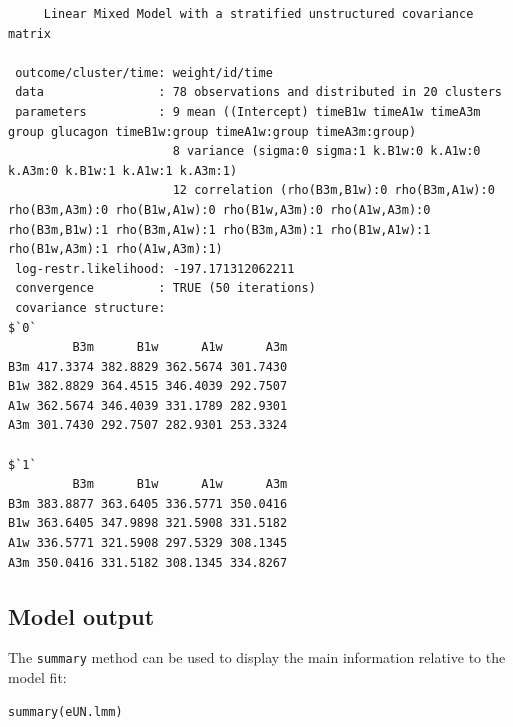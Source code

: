 \documentclass[12pt]{article}
\begin{document}
\begin{verbatim}
     Linear Mixed Model with a stratified unstructured covariance matrix 

 outcome/cluster/time: weight/id/time 
 data                : 78 observations and distributed in 20 clusters 
 parameters          : 9 mean ((Intercept) timeB1w timeA1w timeA3m group glucagon timeB1w:group timeA1w:group timeA3m:group) 
                       8 variance (sigma:0 sigma:1 k.B1w:0 k.A1w:0 k.A3m:0 k.B1w:1 k.A1w:1 k.A3m:1) 
                       12 correlation (rho(B3m,B1w):0 rho(B3m,A1w):0 rho(B3m,A3m):0 rho(B1w,A1w):0 rho(B1w,A3m):0 rho(A1w,A3m):0 rho(B3m,B1w):1 rho(B3m,A1w):1 rho(B3m,A3m):1 rho(B1w,A1w):1 rho(B1w,A3m):1 rho(A1w,A3m):1) 
 log-restr.likelihood: -197.171312062211 
 convergence         : TRUE (50 iterations)
 covariance structure: 
$`0`
         B3m      B1w      A1w      A3m
B3m 417.3374 382.8829 362.5674 301.7430
B1w 382.8829 364.4515 346.4039 292.7507
A1w 362.5674 346.4039 331.1789 282.9301
A3m 301.7430 292.7507 282.9301 253.3324

$`1`
         B3m      B1w      A1w      A3m
B3m 383.8877 363.6405 336.5771 350.0416
B1w 363.6405 347.9898 321.5908 331.5182
A1w 336.5771 321.5908 297.5329 308.1345
A3m 350.0416 331.5182 308.1345 334.8267
\end{verbatim}

\clearpage

\subsection{Model output}
\label{sec:orgc18fae3}

The \texttt{summary} method can be used to display the main information
relative to the model fit:
\lstset{language=r,label= ,caption= ,captionpos=b,numbers=none}
\begin{lstlisting}
summary(eUN.lmm)
\end{lstlisting}
\end{document}
